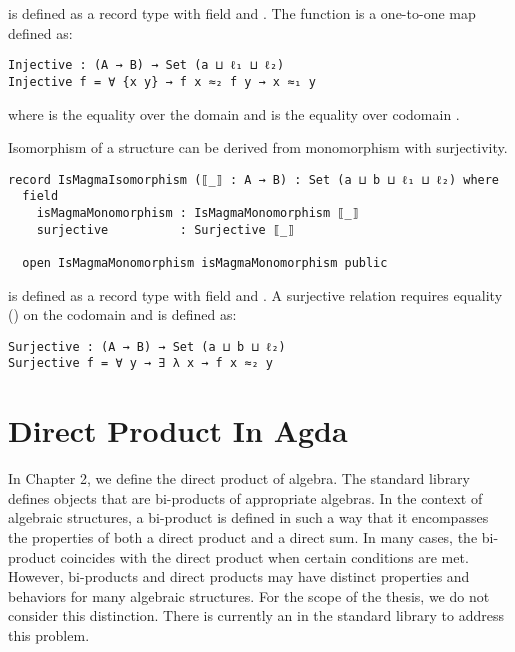  is defined as a record type with field
 and . The 
function is a one-to-one map defined as:

\begin{verbatim}
Injective : (A → B) → Set (a ⊔ ℓ₁ ⊔ ℓ₂)
Injective f = ∀ {x y} → f x ≈₂ f y → x ≈₁ y
\end{verbatim}

where  is the equality over the domain  and 
is the equality over codomain .

Isomorphism of a structure can be derived from monomorphism with surjectivity.

\begin{verbatim}
record IsMagmaIsomorphism (⟦_⟧ : A → B) : Set (a ⊔ b ⊔ ℓ₁ ⊔ ℓ₂) where
  field
    isMagmaMonomorphism : IsMagmaMonomorphism ⟦_⟧
    surjective          : Surjective ⟦_⟧

  open IsMagmaMonomorphism isMagmaMonomorphism public
\end{verbatim} 

 is defined as a record type with field
 and . A surjective relation
requires equality () on the codomain  and is defined as:

\begin{verbatim}
Surjective : (A → B) → Set (a ⊔ b ⊔ ℓ₂)
Surjective f = ∀ y → ∃ λ x → f x ≈₂ y
\end{verbatim}

\section{Direct Product In Agda}
\label{directproduct}
In Chapter 2, we define the direct product of algebra. The standard library defines
objects that are bi-products of appropriate algebras. In the context of algebraic
structures, a bi-product is defined in such a way that it encompasses the
properties of both a direct product and a direct sum. In many cases, the
bi-product coincides with the direct product when certain conditions are met.
However, bi-products and direct products may have distinct properties and
behaviors for many algebraic structures. For the scope of the thesis, we do not
consider this distinction. There is currently an
 in the standard
library to address this problem. 

